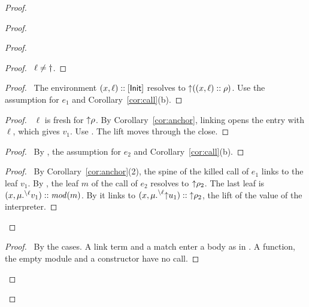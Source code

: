 \begin{proof}
\begin{proof}
\begin{proof}
\begin{proof}
        \pf\ $\ell\neq\dagger$.
      \end{proof}
      \begin{proof}
        \pf\ The environment $(x,\ell)\cons[\InitE]$ resolves to ${\uparrow}{((x,\ell)::\rho)}$.
        Use the assumption for $e_1$ and Corollary~\ref{cor:call}(b).
      \end{proof}
      \begin{proof}
        \pf\ $\ell$ is fresh for ${\uparrow}{\rho}$.
        By Corollary~\ref{cor:anchor}, linking opens the entry with $\ell$, which gives $v_1$.
        Use .
        The lift moves through the close.
      \end{proof}
      \begin{proof}
        \pf\ By , the assumption for $e_2$ and Corollary~\ref{cor:call}(b).
      \end{proof}
      \qedstep
      \begin{proof}
        \pf\ By Corollary~\ref{cor:anchor}(2), the spine of the killed call of $e_1$ links to the leaf $v_1$.
        By , the leaf $m$ of the call of $e_2$ resolves to ${\uparrow}{\rho_2}$.
        The last leaf is $(x,\mu.{\prescript{\backslash{\ell}}{}{v_1}})::\mathit{mod}(m)$.
        By  it links to $(x,\mu.{\prescript{\backslash{\ell}}{}{{\uparrow}{u_1}}})::{\uparrow}{\rho_2}$, the lift of the value of the interpreter.
      \end{proof}
    \end{proof}
    \qedstep
    \begin{proof}
      \pf\ By the cases.
      A link term and a match enter a body as in .
      A function, the empty module and a constructor have no call.
    \end{proof}
  \end{proof}

\end{proof}
